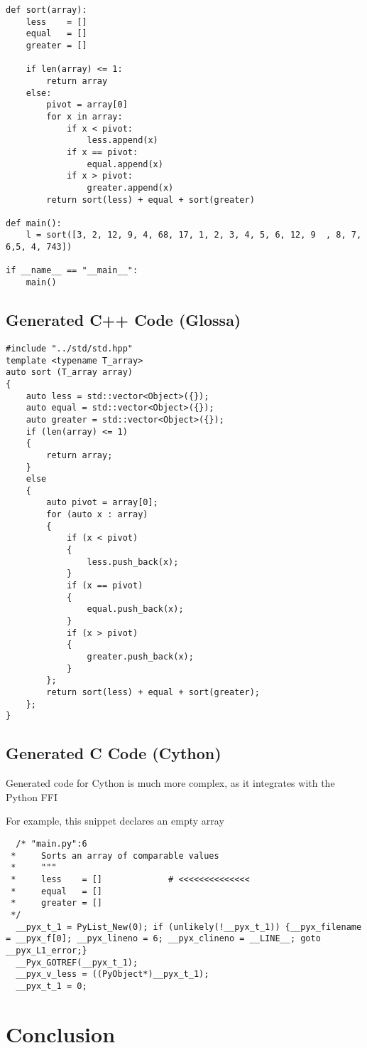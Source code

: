 \documentclass{article}
\begin{document}
\lstset{language=Python}
\begin{lstlisting}
def sort(array):
    less    = []
    equal   = []
    greater = []

    if len(array) <= 1:
        return array
    else:
        pivot = array[0]
        for x in array:
            if x < pivot:
                less.append(x)
            if x == pivot:
                equal.append(x)
            if x > pivot:
                greater.append(x)
        return sort(less) + equal + sort(greater)

def main():
    l = sort([3, 2, 12, 9, 4, 68, 17, 1, 2, 3, 4, 5, 6, 12, 9  , 8, 7, 6,5, 4, 743])

if __name__ == "__main__":
    main()
\end{lstlisting}

\lstset{language=C}

\newpage
\subsection{Generated C++ Code (Glossa)}

\begin{lstlisting}
#include "../std/std.hpp"
template <typename T_array>
auto sort (T_array array)
{
    auto less = std::vector<Object>({});
    auto equal = std::vector<Object>({});
    auto greater = std::vector<Object>({});
    if (len(array) <= 1)
    {
        return array;
    }
    else
    {
        auto pivot = array[0];
        for (auto x : array)
        {
            if (x < pivot)
            {
                less.push_back(x);
            }
            if (x == pivot)
            {
                equal.push_back(x);
            }
            if (x > pivot)
            {
                greater.push_back(x);
            }
        };
        return sort(less) + equal + sort(greater);
    };
}
\end{lstlisting}

\newpage
\subsection{Generated C Code (Cython)}

Generated code for Cython is much more complex, as it integrates with the Python FFI

For example, this snippet declares an empty array

\begin{lstlisting}
  /* "main.py":6
 *     Sorts an array of comparable values
 *     """
 *     less    = []             # <<<<<<<<<<<<<<
 *     equal   = []
 *     greater = []
 */
  __pyx_t_1 = PyList_New(0); if (unlikely(!__pyx_t_1)) {__pyx_filename = __pyx_f[0]; __pyx_lineno = 6; __pyx_clineno = __LINE__; goto __pyx_L1_error;}
  __Pyx_GOTREF(__pyx_t_1);
  __pyx_v_less = ((PyObject*)__pyx_t_1);
  __pyx_t_1 = 0;
\end{lstlisting}

\newpage

\section{Conclusion}
\end{document}
